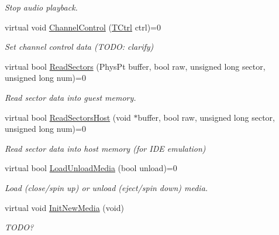 \begin{DoxyCompactItemize}
\begin{DoxyCompactList}\small\item\em Stop audio playback. \end{DoxyCompactList}\item 
\hypertarget{classCDROM__Interface_a7ad6149099c04af804e543613e69d9bd}{virtual void \hyperlink{classCDROM__Interface_a7ad6149099c04af804e543613e69d9bd}{Channel\-Control} (\hyperlink{structSCtrl}{T\-Ctrl} ctrl)=0}\label{classCDROM__Interface_a7ad6149099c04af804e543613e69d9bd}

\begin{DoxyCompactList}\small\item\em Set channel control data (T\-O\-D\-O\-: clarify) \end{DoxyCompactList}\item 
\hypertarget{classCDROM__Interface_afb4989b5b1881a03123442adddcfa6d7}{virtual bool \hyperlink{classCDROM__Interface_afb4989b5b1881a03123442adddcfa6d7}{Read\-Sectors} (Phys\-Pt buffer, bool raw, unsigned long sector, unsigned long num)=0}\label{classCDROM__Interface_afb4989b5b1881a03123442adddcfa6d7}

\begin{DoxyCompactList}\small\item\em Read sector data into guest memory. \end{DoxyCompactList}\item 
\hypertarget{classCDROM__Interface_ae056d63e7b104c7a05afc7c68ee34718}{virtual bool \hyperlink{classCDROM__Interface_ae056d63e7b104c7a05afc7c68ee34718}{Read\-Sectors\-Host} (void $\ast$buffer, bool raw, unsigned long sector, unsigned long num)=0}\label{classCDROM__Interface_ae056d63e7b104c7a05afc7c68ee34718}

\begin{DoxyCompactList}\small\item\em Read sector data into host memory (for I\-D\-E emulation) \end{DoxyCompactList}\item 
\hypertarget{classCDROM__Interface_a5d52a31065d3b87924c5d059266fd20e}{virtual bool \hyperlink{classCDROM__Interface_a5d52a31065d3b87924c5d059266fd20e}{Load\-Unload\-Media} (bool unload)=0}\label{classCDROM__Interface_a5d52a31065d3b87924c5d059266fd20e}

\begin{DoxyCompactList}\small\item\em Load (close/spin up) or unload (eject/spin down) media. \end{DoxyCompactList}\item 
\hypertarget{classCDROM__Interface_a688bdeb135e3238178883666c34aaa75}{virtual void \hyperlink{classCDROM__Interface_a688bdeb135e3238178883666c34aaa75}{Init\-New\-Media} (void)}\label{classCDROM__Interface_a688bdeb135e3238178883666c34aaa75}

\begin{DoxyCompactList}\small\item\em T\-O\-D\-O? \end{DoxyCompactList}\end{DoxyCompactItemize}


